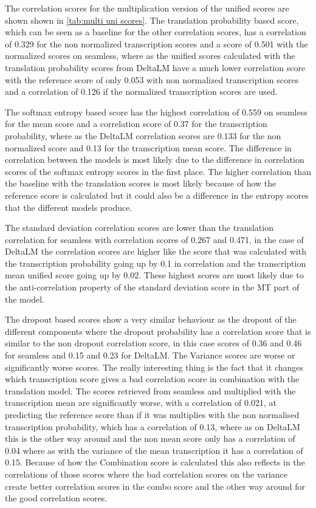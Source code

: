 The correlation scores for the multiplication version of the unified scores are shown shown in \autoref{tab:multi uni scores}. The translation probability based score, which can be seen as a baseline for the other correlation scores, has a correlation of 0.329 for the non normalized transcription scores and a score of 0.501 with the normalized scores on seamless, where as the unified scores calculated with the translation probability scores from DeltaLM have a much lower correlation score with the reference score of only 0.053 with non normalized transcription scores and a correlation of 0.126 if the normalized transcription scores are used. 

The softmax entropy based score has the highest correlation of 0.559 on seamless for the mean score and a correlation score of 0.37 for the transcription probability, where as the DeltaLM correlation scores are 0.133 for the non normalized score and 0.13 for the transcription mean score. The difference in correlation between the models is most likely due to the difference in correlation scores of the softmax entropy scores in the first place. The higher correlation than the baseline with the translation scores is most likely because of how the reference score is calculated but it could also be a difference in the entropy scores that the different models produce.

The standard deviation correlation scores are lower than the translation correlation for seamless with correlation scores of 0.267 and 0.471, in the case of DeltaLM the correlation scores are higher like the score that was calculated with the transcription probability going up by 0.1 in correlation and the transcription mean unified score going up by 0.02. These highest scores are most likely due to the anti-correlation property of the standard deviation score in the MT part of the model. 

The dropout based scores show a very similar behaviour as the dropout of the different components where the dropout probability has a correlation score that is similar to the non dropout correlation score, in this case scores of 0.36 and 0.46 for seamless and 0.15 and 0.23 for DeltaLM. 
The Variance scores are worse or significantly worse scores. The really interesting thing is the fact that it changes which transcription score gives a bad correlation score in combination with the translation model. The scores retrieved from seamless and multiplied with the transcription mean are significantly worse, with a correlation of 0.021, at predicting the reference score than if it was multiplies with the non normalised transcription probability, which has a correlation of 0.13, where as on DeltaLM this is the other way around and the  non mean score only has a correlation of 0.04 where as with the variance of the mean transcription it has a correlation of 0.15. Because of how the Combination score is calculated this also reflects in the correlations of those scores where the bad correlation scores on the variance create better correlation scores in the combo score and the other way around for the good correlation scores.

